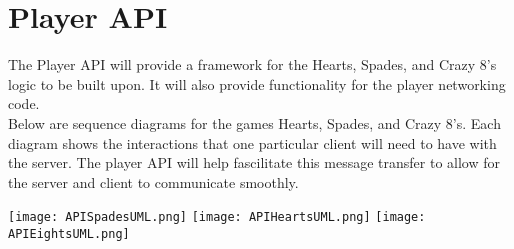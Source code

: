 \section*{Player API}
The Player API will provide a framework for the Hearts, Spades, and Crazy 8's logic to be built upon. It will also provide functionality for the player networking code. \\
\newline
Below are sequence diagrams for the games Hearts, Spades, and Crazy 8's. Each diagram shows the interactions that one particular client will need to have with the server. The player API will help fascilitate this message transfer to allow for the server and client to communicate smoothly.\\
\begin{center}
  \texttt{[image: APISpadesUML.png]}
  \texttt{[image: APIHeartsUML.png]}
  \texttt{[image: APIEightsUML.png]}
\end{center}
